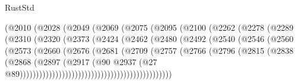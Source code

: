 \begin{lexlean}{RustStd}
\begin{coremodule}
                            (@2010
                              (@2028
                                (@2049
                                  (@2069
                                    (@2075
                                      (@2095
                                        (@2100
                                          (@2262
                                            (@2278
                                              (@2289
                                                (@2310
                                                  (@2320
                                                    (@2373
                                                      (@2424
                                                        (@2462
                                                          (@2480
                                                            (@2492
                                                              (@2540
                                                                (@2546
                                                                  (@2560
                                                                    (@2573
                                                                      (@2660
                                                                        (@2676
                                                                          (@2681
                                                                            (@2709
                                                                              (@2757
                                                                                (@2766
                                                                                  (@2796
                                                                                    (@2815
                                                                                      (@2838
                                                                                        (@2868
                                                                                          (@2897
                                                                                            (@2917
                                                                                              (@90
                                                                                                @2937
                                                                                                (@27
                                                                                                  @89)))))))))))))))))))))))))))))))))))))))))))))))

\end{coremodule}
\end{lexlean}
